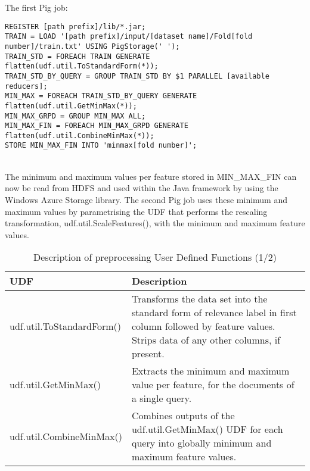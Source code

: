 The first Pig job:\\
\begin{minipage}{\linewidth}
\begin{lstlisting}
REGISTER [path prefix]/lib/*.jar;
TRAIN = LOAD '[path prefix]/input/[dataset name]/Fold[fold number]/train.txt' USING PigStorage(' ');
TRAIN_STD = FOREACH TRAIN GENERATE flatten(udf.util.ToStandardForm(*));
TRAIN_STD_BY_QUERY = GROUP TRAIN_STD BY $1 PARALLEL [available reducers];
MIN_MAX = FOREACH TRAIN_STD_BY_QUERY GENERATE flatten(udf.util.GetMinMax(*));
MIN_MAX_GRPD = GROUP MIN_MAX ALL;
MIN_MAX_FIN = FOREACH MIN_MAX_GRPD GENERATE flatten(udf.util.CombineMinMax(*));
STORE MIN_MAX_FIN INTO 'minmax[fold number]';
\end{lstlisting}
\end{minipage}\\

The minimum and maximum values per feature stored in MIN\_MAX\_FIN can now be read from \ac{HDFS} and used within the Java framework by using the Windows Azure Storage library. The second Pig job uses these minimum and maximum values by parametrising the \ac{UDF} that performs the rescaling transformation, udf.util.ScaleFeatures(), with the minimum and maximum feature values.\\

\begin{table}
\centering
\begin{tabular}{p{6cm}p{7cm}}\toprule
UDF & Description \\
\midrule
udf.util.ToStandardForm() & Transforms the data set into the standard form of relevance label in first column followed by feature values. Strips data of any other columns, if present.\\
udf.util.GetMinMax() & Extracts the minimum and maximum value per feature, for the documents of a single query.\\
udf.util.CombineMinMax() & Combines outputs of the udf.util.GetMinMax() UDF for each query into globally minimum and maximum feature values.\\
\bottomrule
\end{tabular}
\caption{Description of preprocessing User Defined Functions (1/2)}
\label{tbl:preprocessing_udfs_1}
\end{table}


